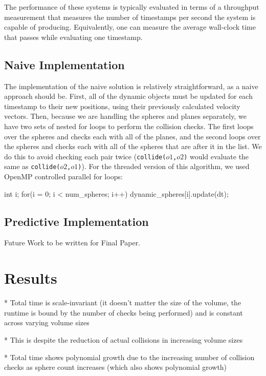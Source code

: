 \documentclass[conference]{IEEEtran}
\begin{document}
The performance of these systems is typically evaluated in terms of a throughput measurement that measures the number of timestamps per second the system is capable of producing.  Equivalently, one can measure the average wall-clock time that passes while evaluating one timestamp.

\subsection{Naive Implementation}

The implementation of the naive solution is relatively straightforward, as a naive approach should be.  First, all of the dynamic objects must be updated for each timestamp to their new positions, using their previously calculated velocity vectors.  Then, because we are handling the spheres and planes separately, we have two sets of nested for loops to perform the collision checks.  The first loops over the spheres and checks each with all of the planes, and the second loops over the spheres and checks each with all of the spheres that are after it in the list.  We do this to avoid checking each pair twice (\texttt{collide($o1$,$o2$)} would evaluate the same as \texttt{collide($o2$,$o1$)}). For the threaded version of this algorithm, we used OpenMP controlled parallel for loops:
\begin{verbatimtab}[3]
	int i;
	for(i = 0; i < num_spheres; i++)
	{
		dynamic_spheres[i].update(dt);
	}
\end{verbatimtab}

\subsection{Predictive Implementation}

Future Work to be written for Final Paper.

\section{Results} %

* Total time is scale-invariant (it doesn't matter the size of the volume, the runtime is bound by the number of checks being performed) and is constant across varying volume sizes

* This is despite the reduction of actual collisions in increasing volume sizes

* Total time shows polynomial growth due to the increasing number of collision checks as sphere count increases (which also shows polynomial growth)
\end{document}
